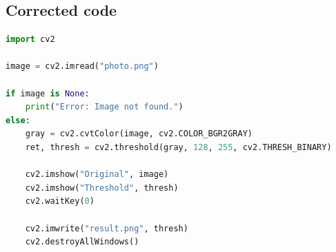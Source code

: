 \documentclass[11pt]{article}
\begin{document}
\subsection*{Corrected code}
\begin{lstlisting}[language=Python]
import cv2

image = cv2.imread("photo.png")

if image is None:
    print("Error: Image not found.")
else:
    gray = cv2.cvtColor(image, cv2.COLOR_BGR2GRAY)
    ret, thresh = cv2.threshold(gray, 128, 255, cv2.THRESH_BINARY)

    cv2.imshow("Original", image)
    cv2.imshow("Threshold", thresh)
    cv2.waitKey(0)

    cv2.imwrite("result.png", thresh)
    cv2.destroyAllWindows()
\end{lstlisting}
\end{document}
